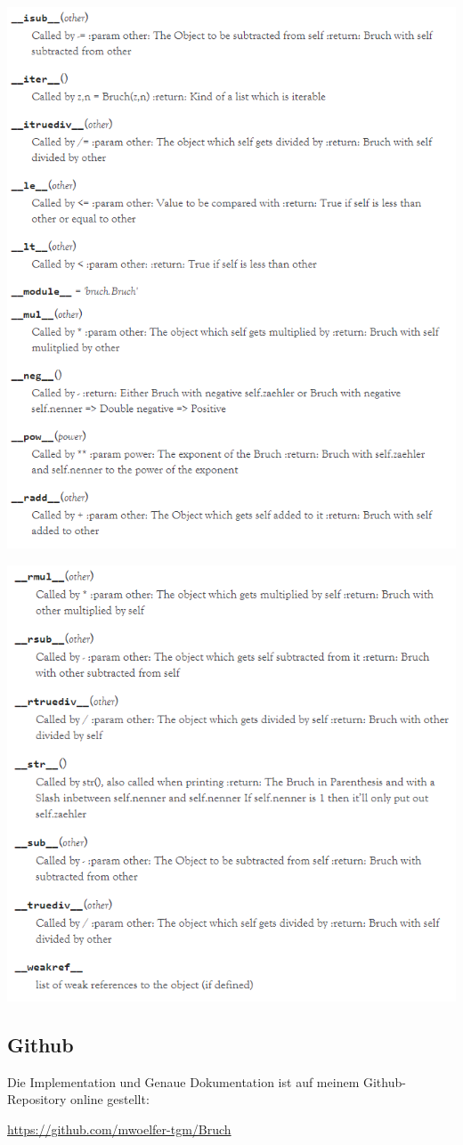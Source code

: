 \begin{minipage}{\linewidth}
	\centering
	\includegraphics[width=1\linewidth]{images/dokumentation3}
\end{minipage}

\begin{minipage}{\linewidth}
	\centering
	\includegraphics[width=1\linewidth]{images/dokumentation4}
\end{minipage}

\subsection{Github}
Die Implementation und Genaue Dokumentation ist auf meinem Github-Repository online gestellt:

\hyperlink{https://github.com/mwoelfer-tgm/Bruch}{https://github.com/mwoelfer-tgm/Bruch}